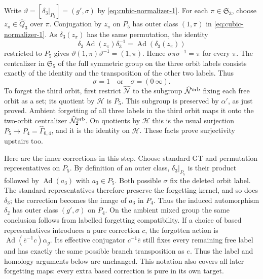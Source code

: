 Write $\vartheta=[\delta_3|_{P_5}]=(g',\sigma)$ by \eqref{eq:cubic-normalizer-1}.
For each $\pi\in\mathfrak S_3$, choose $z_\pi\in
\widehat Q_3$ over $\pi$. Conjugation by $z_\pi$ on
$P_5$ has outer class $(1,\pi)$ in \eqref{eq:cubic-normalizer-1}. As
$\delta_3(z_\pi)$ has the same permutation, the identity
\[
 \delta_3\operatorname{Ad}(z_\pi)\delta_3^{-1}
       =\operatorname{Ad}(\delta_3(z_\pi))
\]
restricted to $P_5$ gives
$\vartheta(1,\pi)\vartheta^{-1}=(1,\pi)$.
Hence $\sigma\pi\sigma^{-1}=\pi$ for every $\pi$.
The centralizer in $\mathfrak S_5$ of the full symmetric
group on the three orbit labels consists exactly of the
identity and the transposition of the other two labels.
Thus
\begin{equation}\label{eq:cubic-normalizer-6}
\sigma=1\quad\text{or}\quad\sigma=(0\ \infty).
\end{equation}
To forget the third orbit, first restrict $\widehat{\mathcal N}$
to the subgroup $\widehat{\mathcal N}^{\rm orb}$ fixing each free
orbit as a set; its quotient by $\mathcal H$ is $P_5$. This subgroup
is preserved by $\alpha'$, as just proved. Ambient forgetting
of all three labels in the third orbit maps it onto the
two-orbit centralizer $\widehat{\mathcal N}_2^{\rm orb}$.
On quotients by $\mathcal H$ this is the usual surjection
$P_5\to P_4=\widehat\Gamma_{0,4}$, and it is the
identity on $\mathcal H$. These facts prove surjectivity upstairs too.

Here are the inner corrections in this step. Choose standard
GT and permutation representatives on $P_5$. By definition
of an outer class, $\delta_3|_{P_5}$ is their product
followed by $\operatorname{Ad}(a_3)$ with $a_3\in P_5$.
Both possible $\sigma$ fix the deleted orbit label.
The standard representatives therefore preserve the
forgetting kernel, and so does $\delta_3$; the correction
becomes the image of $a_3$ in $P_4$. Thus the
induced automorphism $\delta_2$ has outer class
$(g',\sigma)$ on $P_4$.
On the ambient mixed group the same conclusion follows from
labelled forgetting compatibility. If a choice of based
representatives introduces a pure correction $c$, the
forgotten action is
$\operatorname{Ad}(\bar e^{-1}c)\alpha_g$.
Its effective conjugator $c^{-1}\bar e$ still fixes every
remaining free label and has exactly the same possible
branch transposition as $e$. Thus the label and homology
arguments below are unchanged. This notation also covers
all later forgetting maps: every extra based correction is
pure in its own target.

